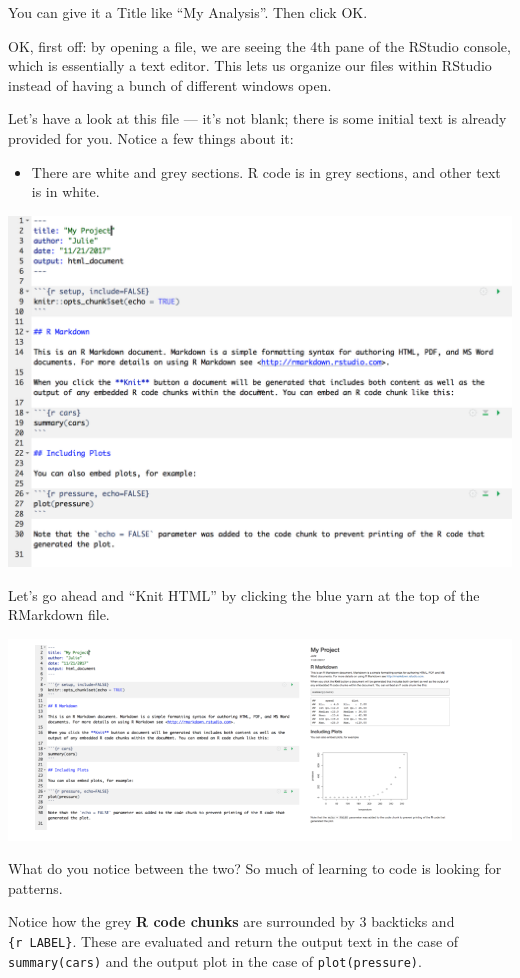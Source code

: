 \documentclass[]{book}
\providecommand{\tightlist}{%
  \setlength{\itemsep}{0pt}\setlength{\parskip}{0pt}}
\begin{document}
You can give it a Title like ``My Analysis''. Then click OK.

OK, first off: by opening a file, we are seeing the 4th pane of the RStudio console, which is essentially a text editor. This lets us organize our files within RStudio instead of having a bunch of different windows open.

Let's have a look at this file --- it's not blank; there is some initial text is already provided for you. Notice a few things about it:

\begin{itemize}
\tightlist
\item
  There are white and grey sections. R code is in grey sections, and other text is in white.
\end{itemize}

\includegraphics[width=0.8\linewidth]{img/rmarkdown}

Let's go ahead and ``Knit HTML'' by clicking the blue yarn at the top of the RMarkdown file.

\includegraphics[width=0.8\linewidth]{img/rmarkdown_side_by_side}

What do you notice between the two? So much of learning to code is looking for patterns.

Notice how the grey \textbf{R code chunks} are surrounded by 3 backticks and \texttt{\{r\ LABEL\}}. These are evaluated and return the output text in the case of \texttt{summary(cars)} and the output plot in the case of \texttt{plot(pressure)}.
\end{document}
